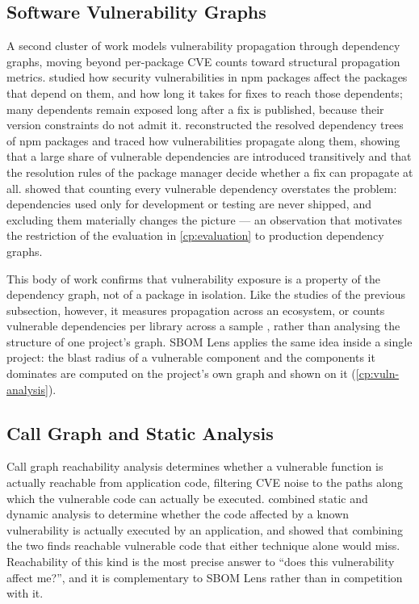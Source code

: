 \subsection{Software Vulnerability Graphs}
\label{sec:rw-vuln-graphs}

A second cluster of work models vulnerability propagation through dependency graphs, moving beyond per-package CVE counts toward structural propagation metrics. \citet{Decan2018} studied how security vulnerabilities in npm packages affect the packages that depend on them, and how long it takes for fixes to reach those dependents; many dependents remain exposed long after a fix is published, because their version constraints do not admit it. \citet{Liu2022} reconstructed the resolved dependency trees of npm packages and traced how vulnerabilities propagate along them, showing that a large share of vulnerable dependencies are introduced transitively and that the resolution rules of the package manager decide whether a fix can propagate at all. \citet{Pashchenko2018} showed that counting every vulnerable dependency overstates the problem: dependencies used only for development or testing are never shipped, and excluding them materially changes the picture --- an observation that motivates the restriction of the evaluation in \autoref{cp:evaluation} to production dependency graphs.

This body of work confirms that vulnerability exposure is a property of the dependency graph, not of a package in isolation. Like the studies of the previous subsection, however, it measures propagation across an ecosystem, or counts vulnerable dependencies per library across a sample \citep{Pashchenko2018}, rather than analysing the structure of one project's graph. SBOM Lens applies the same idea inside a single project: the blast radius of a vulnerable component and the components it dominates are computed on the project's own graph and shown on it (\autoref{cp:vuln-analysis}).


\subsection{Call Graph and Static Analysis}
\label{sec:rw-call-graphs}

Call graph reachability analysis determines whether a vulnerable function is actually reachable from application code, filtering CVE noise to the paths along which the vulnerable code can actually be executed. \citet{Ponta2018} combined static and dynamic analysis to determine whether the code affected by a known vulnerability is actually executed by an application, and showed that combining the two finds reachable vulnerable code that either technique alone would miss. Reachability of this kind is the most precise answer to ``does this vulnerability affect me?'', and it is complementary to SBOM Lens rather than in competition with it.

